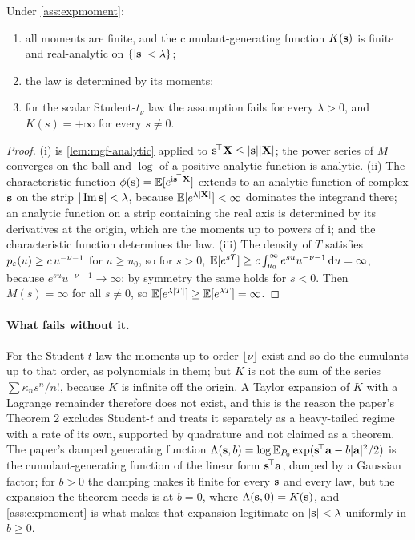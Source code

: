 \begin{proposition}
\label{prop:expmoment-consequences}
Under \cref{ass:expmoment}:
\begin{enumerate}[label=(\roman*)]
\item all moments are finite, and the cumulant-generating function $K(\mathbf{s})$ is
  finite and real-analytic on $\{|\mathbf{s}|<\lambda\}$;
\item the law is determined by its moments;
\item for the scalar Student-$t_\nu$ law the assumption fails for every $\lambda>0$,
  and $K(s)=+\infty$ for every $s\ne0$.
\end{enumerate}
\end{proposition}
\begin{proof}
(i) is \cref{lem:mgf-analytic} applied to $\mathbf{s}^{\!\top}\mathbf{X}\le|\mathbf{s}||\mathbf{X}|$; the
power series of $M$ converges on the ball and $\log$ of a positive analytic function
is analytic. (ii) The characteristic function $\phi(\mathbf{s})=\mathbb{E}[e^{\mathrm i\mathbf{s}^{\!\top}\mathbf{X}}]$
extends to an analytic function of complex $\mathbf{s}$ on the strip $|\operatorname{Im}\mathbf{s}|<\lambda$,
because $\mathbb{E}[e^{\lambda|\mathbf{X}|}]<\infty$ dominates the integrand there; an analytic
function on a strip containing the real axis is determined by its derivatives at the
origin, which are the moments up to powers of $\mathrm i$; and the characteristic
function determines the law. (iii) The density of $T$ satisfies $p_{\varepsilon}(u)\ge c\,u^{-\nu-1}$
for $u\ge u_0$, so for $s>0$,
$\mathbb{E}[e^{sT}]\ge c\int_{u_0}^\infty e^{su}u^{-\nu-1}\,\mathrm{d} u=\infty$, because
$e^{su}u^{-\nu-1}\to\infty$; by symmetry the same holds for $s<0$. Then $M(s)=\infty$
for all $s\ne0$, so $\mathbb{E}[e^{\lambda|T|}]\ge\mathbb{E}[e^{\lambda T}]=\infty$.
\end{proof}

\paragraph{What fails without it.}
For the Student-$t$ law the moments up to order $\lfloor\nu\rfloor$ exist and so do
the cumulants up to that order, as polynomials in them; but $K$ is not the sum of the
series $\sum\kappa_ns^n/n!$, because $K$ is infinite off the origin. A Taylor expansion
of $K$ with a Lagrange remainder therefore does not exist, and this is the reason the
paper's Theorem 2 excludes Student-$t$ and treats it separately as a heavy-tailed
regime with a rate of its own, supported by quadrature and not claimed as a theorem.
The paper's damped generating function
$\Lambda(\mathbf{s},b)=\log\mathbb{E}_{P_0}\exp(\mathbf{s}^{\!\top}\mathbf{a}-b|\mathbf{a}|^2/2)$ is the cumulant-generating
function of the linear form $\mathbf{s}^{\!\top}\mathbf{a}$, damped by a Gaussian factor; for $b>0$
the damping makes it finite for every $\mathbf{s}$ and every law, but the expansion the
theorem needs is at $b=0$, where $\Lambda(\mathbf{s},0)=K(\mathbf{s})$, and \cref{ass:expmoment}
is what makes that expansion legitimate on $|\mathbf{s}|<\lambda$ uniformly in $b\ge0$.


